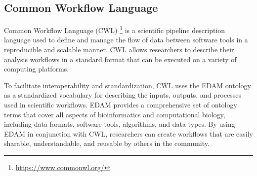 \documentclass{scrartcl}
\begin{document}
  

\subsection{Common Workflow Language}

Common Workflow Language (CWL) \cite{cwl} \footnote{\url{https://www.commonwl.org/}} is a scientific pipeline description language used to define and manage the 
  flow of data between software tools in a reproducible and scalable manner. CWL allows researchers to 
  describe their analysis workflows in a standard format that can be executed on a variety of computing 
  platforms.

To facilitate interoperability and standardization, CWL uses the EDAM ontology as a standardized 
  vocabulary for describing the inputs, outputs, and processes used in scientific workflows. 
  EDAM provides a comprehensive set of ontology terms that cover all aspects of bioinformatics and 
  computational biology, including data formats, software tools, algorithms, and data types. 
  By using EDAM in conjunction with CWL, researchers can create workflows that are easily sharable, 
  understandable, and reusable by others in the community.


\newpage
{}
\printbibliography %
\end{document}
